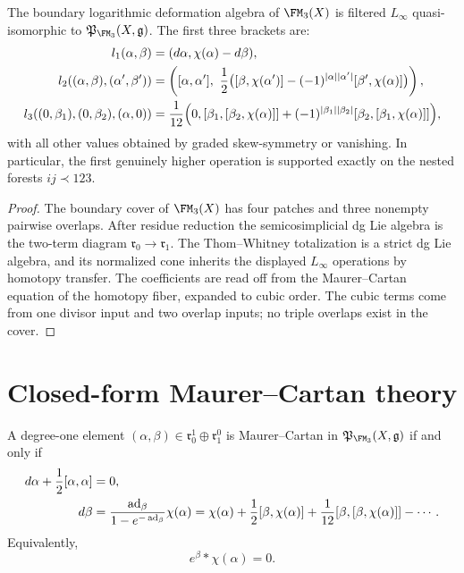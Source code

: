 \begin{theorem}
\label{thm:fm3-small-model-synthesis}
The boundary logarithmic deformation algebra of $\FM_3(X)$ is filtered
$L_\infty$ quasi-isomorphic to $\mathfrak P_{\FM_3}(X,\mathfrak g)$. The first
three brackets are:
\begin{align}
\label{eq:syn-l1}
l_1(\alpha,\beta) &= (d\alpha,\chi(\alpha)-d\beta),\\
\label{eq:syn-l2}
l_2((\alpha,\beta),(\alpha',\beta'))
&=
\left([
\alpha,\alpha'],\ \frac12\bigl([\beta,\chi(\alpha')] - (-1)^{|\alpha||\alpha'|}[\beta',\chi(\alpha)]\bigr)\right),\\
\label{eq:syn-l3}
l_3((0,\beta_1),(0,\beta_2),(\alpha,0))
&=
\frac1{12}\Bigl(0,
[\beta_1,[\beta_2,\chi(\alpha)]]+(-1)^{|\beta_1||\beta_2|}[\beta_2,[\beta_1,\chi(\alpha)]]\Bigr),
\end{align}
with all other values obtained by graded skew-symmetry or vanishing. In
particular, the first genuinely higher operation is supported exactly on the
nested forests $ij\prec 123$.
\end{theorem}

\begin{proof}
The boundary cover of $\FM_3(X)$ has four patches and three nonempty pairwise
overlaps. After residue reduction the semicosimplicial dg Lie algebra is the
two-term diagram $\mathfrak r_0\to\mathfrak r_1$. The Thom--Whitney totalization
is a strict dg Lie algebra, and its normalized cone inherits the displayed
$L_\infty$ operations by homotopy transfer. The coefficients are read off from
the Maurer--Cartan equation of the homotopy fiber, expanded to cubic order. The
cubic terms come from one divisor input and two overlap inputs; no triple
overlaps exist in the cover.
\end{proof}

\section{Closed-form Maurer--Cartan theory}

\begin{theorem}
\label{thm:fm3-mc-synthesis}
A degree-one element $(\alpha,\beta)\in \mathfrak r_0^1\oplus\mathfrak r_1^0$ is
Maurer--Cartan in $\mathfrak P_{\FM_3}(X,\mathfrak g)$ if and only if
\begin{align}
\label{eq:syn-alpha-mc}
d\alpha + \frac12[\alpha,\alpha] &= 0,\\
\label{eq:syn-beta-mc}
d\beta &= \frac{\operatorname{ad}_\beta}{1-e^{-\operatorname{ad}_\beta}}\chi(\alpha)
= \chi(\alpha)+\frac12[\beta,\chi(\alpha)] + \frac1{12}[\beta,[\beta,\chi(\alpha)]] - \cdots.
\end{align}
Equivalently,
\[
e^\beta * \chi(\alpha)=0.
\]
\end{theorem}

